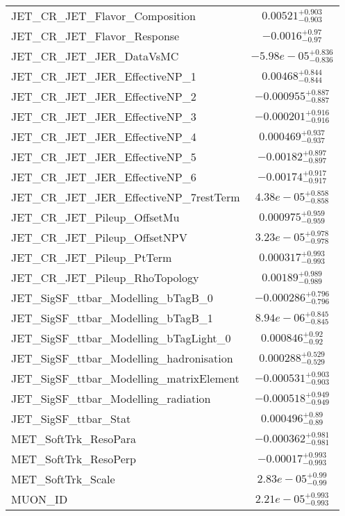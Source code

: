 \begin{tabular}{|l|c|}
JET\_CR\_JET\_Flavor\_Composition & $0.00521^{+0.903}_{-0.903}$ \\
JET\_CR\_JET\_Flavor\_Response & $-0.0016^{+0.97}_{-0.97}$ \\
JET\_CR\_JET\_JER\_DataVsMC & $-5.98e-05^{+0.836}_{-0.836}$ \\
JET\_CR\_JET\_JER\_EffectiveNP\_1 & $0.00468^{+0.844}_{-0.844}$ \\
JET\_CR\_JET\_JER\_EffectiveNP\_2 & $-0.000955^{+0.887}_{-0.887}$ \\
JET\_CR\_JET\_JER\_EffectiveNP\_3 & $-0.000201^{+0.916}_{-0.916}$ \\
JET\_CR\_JET\_JER\_EffectiveNP\_4 & $0.000469^{+0.937}_{-0.937}$ \\
JET\_CR\_JET\_JER\_EffectiveNP\_5 & $-0.00182^{+0.897}_{-0.897}$ \\
JET\_CR\_JET\_JER\_EffectiveNP\_6 & $-0.00174^{+0.917}_{-0.917}$ \\
JET\_CR\_JET\_JER\_EffectiveNP\_7restTerm & $4.38e-05^{+0.858}_{-0.858}$ \\
JET\_CR\_JET\_Pileup\_OffsetMu & $0.000975^{+0.959}_{-0.959}$ \\
JET\_CR\_JET\_Pileup\_OffsetNPV & $3.23e-05^{+0.978}_{-0.978}$ \\
JET\_CR\_JET\_Pileup\_PtTerm & $0.000317^{+0.993}_{-0.993}$ \\
JET\_CR\_JET\_Pileup\_RhoTopology & $0.00189^{+0.989}_{-0.989}$ \\
JET\_SigSF\_ttbar\_Modelling\_bTagB\_0 & $-0.000286^{+0.796}_{-0.796}$ \\
JET\_SigSF\_ttbar\_Modelling\_bTagB\_1 & $8.94e-06^{+0.845}_{-0.845}$ \\
JET\_SigSF\_ttbar\_Modelling\_bTagLight\_0 & $0.000846^{+0.92}_{-0.92}$ \\
JET\_SigSF\_ttbar\_Modelling\_hadronisation & $0.000288^{+0.529}_{-0.529}$ \\
JET\_SigSF\_ttbar\_Modelling\_matrixElement & $-0.000531^{+0.903}_{-0.903}$ \\
JET\_SigSF\_ttbar\_Modelling\_radiation & $-0.000518^{+0.949}_{-0.949}$ \\
JET\_SigSF\_ttbar\_Stat & $0.000496^{+0.89}_{-0.89}$ \\
MET\_SoftTrk\_ResoPara & $-0.000362^{+0.981}_{-0.981}$ \\
MET\_SoftTrk\_ResoPerp & $-0.00017^{+0.993}_{-0.993}$ \\
MET\_SoftTrk\_Scale & $2.83e-05^{+0.99}_{-0.99}$ \\
MUON\_ID & $2.21e-05^{+0.993}_{-0.993}$ \\

\end{tabular}
